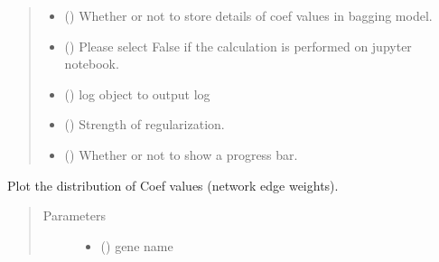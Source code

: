 \documentclass[letterpaper,10pt,english]{sphinxmanual}
\begin{document}
\begin{fulllineitems}
\begin{fulllineitems}
\begin{quote}
\begin{description}
\begin{itemize}
\item {} 
 () \textendash{} Whether or not to store details of coef values in bagging model.

\item {} 
 () \textendash{} Please select False if the calculation is performed on jupyter notebook.

\item {} 
 () \textendash{} log object to output log

\item {} 
 () \textendash{} Strength of regularization.

\item {} 
 () \textendash{} Whether or not to show a progress bar.

\end{itemize}

\end{description}\end{quote}

\end{fulllineitems}


\begin{fulllineitems}
\label{\detokenize{modules/celloracle:celloracle.Net.plotCoefs}}
Plot the distribution of Coef values (network edge weights).
\begin{quote}\begin{description}
\item[{Parameters}] \leavevmode\begin{itemize}
\item {} 
 () \textendash{} gene name


\end{itemize}
\end{description}
\end{quote}
\end{fulllineitems}
\end{fulllineitems}
\end{document}
